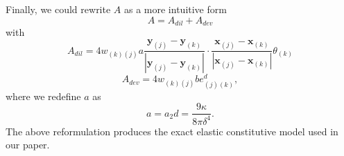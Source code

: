 \documentclass[11pt,fullpage]{article}
\newcommand{\mb}[1]{\mathbf{#1}}
\begin{document}
Finally, we could rewrite $A$ as a more intuitive form
\begin{equation}
A = A_{dil} + A_{dev}
\end{equation}
with
\begin{equation}
A_{dil} = 4w_{(k)(j)} a\frac{\mb{y}_{(j)}-\mb{y}_{(k)}}{|\mb{y}_{(j)}-\mb{y}_{(k)}|}\cdot\frac{\mb{x}_{(j)}-\mb{x}_{(k)}}{|\mb{x}_{(j)}-\mb{x}_{(k)}|}\theta_{(k)}
\end{equation}
\begin{equation}
A_{dev} = 4w_{(k)(j)} b e^d_{(j)(k)},
\end{equation}
where we redefine $a$ as
\begin{equation}
a = a_2d = \frac{9\kappa}{8\pi\delta^4}.
\end{equation}
The above reformulation produces the exact elastic constitutive model used in our paper.




\end{document}
